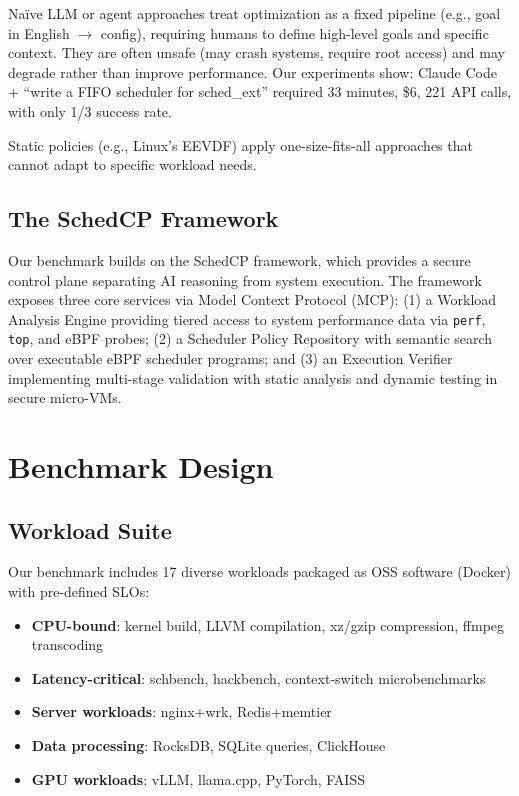 \documentclass{article}
\newcommand{\sys}{SchedCP\xspace}
\begin{document}
Na\"ive LLM or agent approaches treat optimization as a fixed pipeline (e.g., goal in English $\rightarrow$ config), requiring humans to define high-level goals and specific context. They are often unsafe (may crash systems, require root access) and may degrade rather than improve performance. Our experiments show: Claude Code + ``write a FIFO scheduler for sched\_ext'' required 33 minutes, \$6, 221 API calls, with only 1/3 success rate.

Static policies (e.g., Linux's EEVDF) apply one-size-fits-all approaches that cannot adapt to specific workload needs.

\subsection{The \sys Framework}

Our benchmark builds on the \sys framework, which provides a secure control plane separating AI reasoning from system execution. The framework exposes three core services via Model Context Protocol (MCP): (1) a Workload Analysis Engine providing tiered access to system performance data via \texttt{perf}, \texttt{top}, and eBPF probes; (2) a Scheduler Policy Repository with semantic search over executable eBPF scheduler programs; and (3) an Execution Verifier implementing multi-stage validation with static analysis and dynamic testing in secure micro-VMs.

\section{Benchmark Design}

\subsection{Workload Suite}

Our benchmark includes 17 diverse workloads packaged as OSS software (Docker) with pre-defined SLOs:

\begin{itemize}[nosep]
    \item \textbf{CPU-bound}: kernel build, LLVM compilation, xz/gzip compression, ffmpeg transcoding
    \item \textbf{Latency-critical}: schbench, hackbench, context-switch microbenchmarks
    \item \textbf{Server workloads}: nginx+wrk, Redis+memtier
    \item \textbf{Data processing}: RocksDB, SQLite queries, ClickHouse
    \item \textbf{GPU workloads}: vLLM, llama.cpp, PyTorch, FAISS
\end{itemize}
\end{document}
